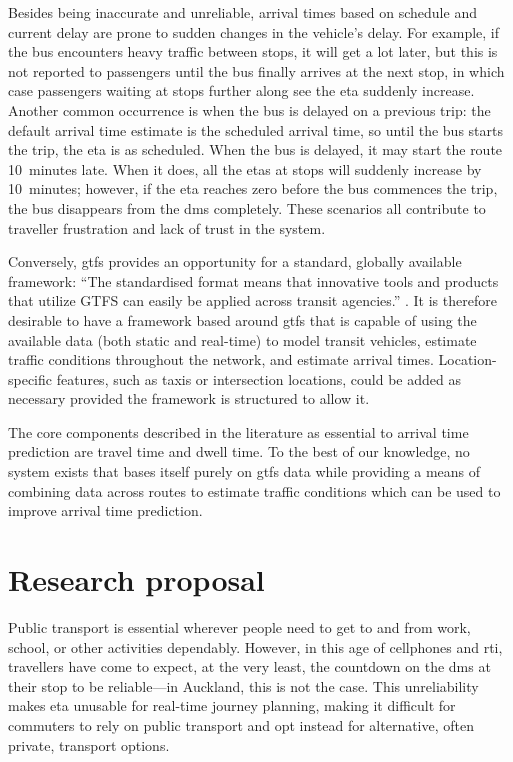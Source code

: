 Besides being inaccurate and unreliable, arrival times based on schedule and current delay are prone to sudden changes in the vehicle's delay. For example, if the bus encounters heavy traffic between stops, it will get a lot later, but this is not reported to passengers until the bus finally arrives at the next stop, in which case passengers waiting at stops further along see the \gls{eta} suddenly increase. Another common occurrence is when the bus is delayed on a previous trip: the default arrival time estimate is the scheduled arrival time, so until the bus starts the trip, the \gls{eta} is as scheduled. When the bus is delayed, it may start the route 10~minutes late. When it does, all the \glspl{eta} at stops will suddenly increase by 10~minutes; however, if the \gls{eta} reaches zero before the bus commences the trip, the bus disappears from the \gls{dms} completely. These scenarios all contribute to traveller frustration and lack of trust in the system.


Conversely, \gls{gtfs} provides an opportunity for a standard, globally available framework: ``The standardised format means that innovative tools and products that utilize GTFS can easily be applied across transit agencies.'' \citep[26]{TCRP_2020}. It is therefore desirable to have a framework based around \gls{gtfs} that is capable of using the available data (both static and real-time) to model transit vehicles, estimate traffic conditions throughout the network, and estimate arrival times. Location-specific features, such as taxis or intersection locations, could be added as necessary provided the framework is structured to allow it.


The core components described in the literature as essential to arrival time prediction are travel time and dwell time. To the best of our knowledge, no system exists that bases itself purely on \gls{gtfs} data while providing a means of combining data across routes to estimate traffic conditions which can be used to improve arrival time prediction.



\section{Research proposal}
\label{sec:proposal}

Public transport is essential wherever people need to get to and from work, school, or other activities dependably. However, in this age of cellphones and \gls{rti}, travellers have come to expect, at the very least, the countdown on the \gls{dms} at their stop to be reliable---in Auckland, this is not the case. This unreliability makes \gls{eta} unusable for real-time journey planning, making it difficult for commuters to rely on public transport and opt instead for alternative, often private, transport options.


